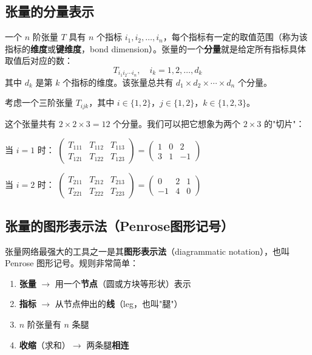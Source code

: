 \documentclass[12pt,a4paper]{ctexart}
\begin{document}
\subsection{张量的分量表示}

一个 $n$ 阶张量 $T$ 具有 $n$ 个指标 $i_1, i_2, \ldots, i_n$，每个指标有一定的取值范围（称为该指标的\textbf{维度}或\textbf{键维度}，bond dimension）。张量的一个\textbf{分量}就是给定所有指标具体取值后对应的数：
\begin{equation}
    T_{i_1 i_2 \cdots i_n}, \quad i_k = 1, 2, \ldots, d_k
\end{equation}
其中 $d_k$ 是第 $k$ 个指标的维度。该张量总共有 $d_1 \times d_2 \times \cdots \times d_n$ 个分量。

\begin{examplebox}[例2：一个具体的三阶张量]
考虑一个三阶张量 $T_{ijk}$，其中 $i \in \{1,2\}$，$j \in \{1,2\}$，$k \in \{1,2,3\}$。

这个张量共有 $2 \times 2 \times 3 = 12$ 个分量。我们可以把它想象为两个 $2\times 3$ 的"切片"：

当 $i=1$ 时：
$\begin{pmatrix} T_{111} & T_{112} & T_{113} \\ T_{121} & T_{122} & T_{123} \end{pmatrix}
= \begin{pmatrix} 1 & 0 & 2 \\ 3 & 1 & -1 \end{pmatrix}$

当 $i=2$ 时：
$\begin{pmatrix} T_{211} & T_{212} & T_{213} \\ T_{221} & T_{222} & T_{223} \end{pmatrix}
= \begin{pmatrix} 0 & 2 & 1 \\ -1 & 4 & 0 \end{pmatrix}$
\end{examplebox}

\subsection{张量的图形表示法（Penrose图形记号）}

张量网络最强大的工具之一是其\textbf{图形表示法}（diagrammatic notation），也叫 Penrose 图形记号。规则非常简单：

\begin{keybox}[图形表示法的基本规则]
\begin{enumerate}
    \item \textbf{张量} $\longrightarrow$ 用一个\textbf{节点}（圆或方块等形状）表示
    \item \textbf{指标} $\longrightarrow$ 从节点伸出的\textbf{线}（leg，也叫"腿"）
    \item $n$ 阶张量有 $n$ 条腿
    \item \textbf{收缩}（求和）$\longrightarrow$ 两条腿\textbf{相连}
\end{enumerate}
\end{keybox}
\end{document}
